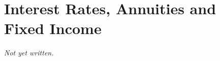\chapter{Interest Rates, Annuities and Fixed Income}\label{ch:interest-annuities-fixed-income}


\textit{Not yet written.}
